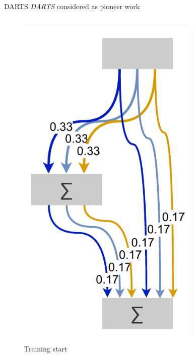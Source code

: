 \documentclass[]{beamer}
\begin{document}
\begin{frame}{DARTS}
\vspace{10pt}
\textit{DARTS} \cite{Liu2018} considered as pioneer work
\vfill
\begin{columns}
\begin{column}{.35\textwidth}
\begin{figure}
	\includegraphics[scale=0.4, center]{graphics/darts_1.pdf}
	\caption{Training start}
\end{figure}
\end{column}
\begin{column}{.3\textwidth}
\begin{figure}

\end{figure}
\end{column}
\end{columns}
\end{frame}
\end{document}
